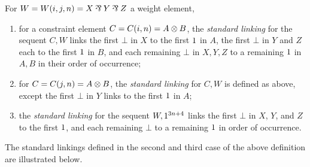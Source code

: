 \documentclass{lmcs}
\begin{document}
                                                                                                                                                                                                                                                                                                                                                                                                                                                                                  
\begin{definition}
\label{def:standard linkings}
For $W=W(i,j,n)=X\pr Y\pr Z$ a weight element,
\begin{enumerate}
	\item
for a constraint element $C=C(i,n)=A\otimes B$, the \emph{standard linking} for the sequent $C,W$ links the first $\bot$ in $X$ to the first $1$ in $A$, the first $\bot$ in $Y$ and $Z$ each to the first $1$ in $B$, and each remaining $\bot$ in $X,Y,Z$ to a remaining $1$ in $A,B$ in their order of occurrence;
	\item
for $C=C(j,n)=A\otimes B$, the \emph{standard linking} for $C,W$ is defined as above, except the first $\bot$ in $Y$ links to the first $1$ in $A$;
	\item
the \emph{standard linking} for the sequent $W,1^{3n+4}$ links the first $\bot$ in $X$, $Y$, and $Z$ to the first $1$, and each remaining $\bot$ to a remaining $1$ in order of occurrence.
\end{enumerate}
\end{definition}

The standard linkings defined in the second and third case of the above definition are illustrated below.
\end{document}

